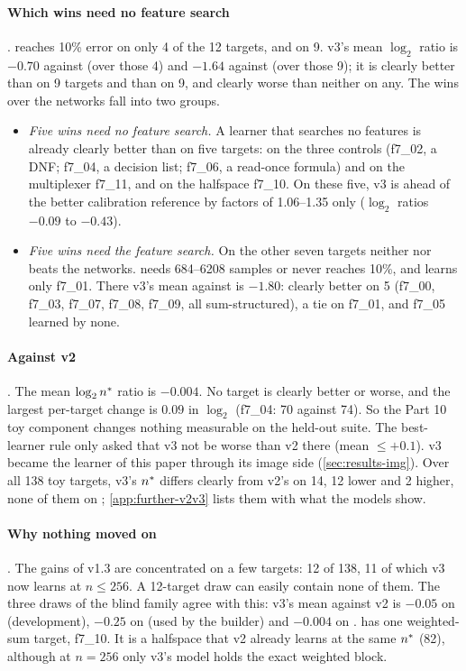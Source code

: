 \paragraph{Which wins need no feature search} .  reaches 10\% error on only 4 of the 12 targets, and  on 9. v3's mean $\log_2$ ratio is $-0.70$ against  (over those 4) and $-1.64$ against  (over those 9); it is clearly better than  on 9 targets and than  on 9, and clearly worse than neither on any. The wins over the networks fall into two groups.
\begin{itemize}
\item \emph{Five wins need no feature search.} A learner that searches no features is already clearly better than  on five targets:  on the three controls (f7\_02, a DNF; f7\_04, a decision list; f7\_06, a read-once formula) and on the multiplexer f7\_11, and  on the halfspace f7\_10. On these five, v3 is ahead of the better calibration reference by factors of 1.06--1.35 only ($\log_2$ ratios $-0.09$ to $-0.43$).
\item \emph{Five wins need the feature search.} On the other seven targets neither  nor  beats the networks.  needs 684--6208 samples or never reaches 10\%, and  learns only f7\_01. There v3's mean against  is $-1.80$: clearly better on 5 (f7\_00, f7\_03, f7\_07, f7\_08, f7\_09, all sum-structured), a tie on f7\_01, and f7\_05 learned by none.
\end{itemize}

\paragraph{Against v2} . The mean $\log_2n^{*}$ ratio is $-0.004$. No target is clearly better or worse, and the largest per-target change is $0.09$ in $\log_2$ (f7\_04: 70 against 74). So the Part 10 toy component changes nothing measurable on the held-out suite. The best-learner rule only asked that v3 not be worse than v2 there (mean $\le+0.1$). v3 became the learner of this paper through its image side (\cref{sec:results-img}). Over all 138 toy targets, v3's $n^{*}$ differs clearly from v2's on 14, 12 lower and 2 higher, none of them on ; \cref{app:further-v2v3} lists them with what the models show.

\paragraph{Why nothing moved on } . The gains of v1.3 are concentrated on a few targets: 12 of 138, 11 of which v3 now learns at $n\le256$. A 12-target draw can easily contain none of them. The three draws of the blind family agree with this: v3's mean against v2 is $-0.05$ on  (development), $-0.25$ on  (used by the builder) and $-0.004$ on .  has one weighted-sum target, f7\_10. It is a halfspace that v2 already learns at the same $n^{*}$ (82), although at $n=256$ only v3's model holds the exact weighted block.

